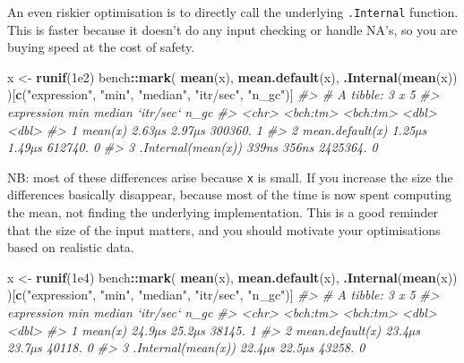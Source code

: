 \documentclass[]{book}
\newenvironment{Shaded}{\begin{snugshade}}{\end{snugshade}}
\newcommand{\CommentTok}[1]{\textcolor[rgb]{0.37,0.37,0.37}{\textit{#1}}}
\newcommand{\FloatTok}[1]{\textcolor[rgb]{0.06,0.06,0.06}{#1}}
\newcommand{\KeywordTok}[1]{\textcolor[rgb]{0.27,0.27,0.27}{\textbf{#1}}}
\newcommand{\NormalTok}[1]{#1}
\newcommand{\OperatorTok}[1]{\textcolor[rgb]{0.43,0.43,0.43}{\textbf{#1}}}
\newcommand{\StringTok}[1]{\textcolor[rgb]{0.5,0.5,0.5}{#1}}
\begin{document}
An even riskier optimisation is to directly call the underlying \texttt{.Internal} function. This is faster because it doesn't do any input checking or handle NA's, so you are buying speed at the cost of safety.

\begin{Shaded}
\begin{Highlighting}[]
\NormalTok{x <-}\StringTok{ }\KeywordTok{runif}\NormalTok{(}\FloatTok{1e2}\NormalTok{)}
\NormalTok{bench}\OperatorTok{::}\KeywordTok{mark}\NormalTok{(}
  \KeywordTok{mean}\NormalTok{(x),}
  \KeywordTok{mean.default}\NormalTok{(x),}
  \KeywordTok{.Internal}\NormalTok{(}\KeywordTok{mean}\NormalTok{(x))}
\NormalTok{)[}\KeywordTok{c}\NormalTok{(}\StringTok{"expression"}\NormalTok{, }\StringTok{"min"}\NormalTok{, }\StringTok{"median"}\NormalTok{, }\StringTok{"itr/sec"}\NormalTok{, }\StringTok{"n_gc"}\NormalTok{)]}
\CommentTok{#> # A tibble: 3 x 5}
\CommentTok{#>   expression              min   median `itr/sec`  n_gc}
\CommentTok{#>   <chr>              <bch:tm> <bch:tm>     <dbl> <dbl>}
\CommentTok{#> 1 mean(x)              2.63µs   2.97µs   300360.     1}
\CommentTok{#> 2 mean.default(x)      1.25µs   1.49µs   612740.     0}
\CommentTok{#> 3 .Internal(mean(x))    339ns    356ns  2425364.     0}
\end{Highlighting}
\end{Shaded}

NB: most of these differences arise because \texttt{x} is small. If you increase the size the differences basically disappear, because most of the time is now spent computing the mean, not finding the underlying implementation. This is a good reminder that the size of the input matters, and you should motivate your optimisations based on realistic data.

\begin{Shaded}
\begin{Highlighting}[]
\NormalTok{x <-}\StringTok{ }\KeywordTok{runif}\NormalTok{(}\FloatTok{1e4}\NormalTok{)}
\NormalTok{bench}\OperatorTok{::}\KeywordTok{mark}\NormalTok{(}
  \KeywordTok{mean}\NormalTok{(x),}
  \KeywordTok{mean.default}\NormalTok{(x),}
  \KeywordTok{.Internal}\NormalTok{(}\KeywordTok{mean}\NormalTok{(x))}
\NormalTok{)[}\KeywordTok{c}\NormalTok{(}\StringTok{"expression"}\NormalTok{, }\StringTok{"min"}\NormalTok{, }\StringTok{"median"}\NormalTok{, }\StringTok{"itr/sec"}\NormalTok{, }\StringTok{"n_gc"}\NormalTok{)]}
\CommentTok{#> # A tibble: 3 x 5}
\CommentTok{#>   expression              min   median `itr/sec`  n_gc}
\CommentTok{#>   <chr>              <bch:tm> <bch:tm>     <dbl> <dbl>}
\CommentTok{#> 1 mean(x)              24.9µs   25.2µs    38145.     1}
\CommentTok{#> 2 mean.default(x)      23.4µs   23.7µs    40118.     0}
\CommentTok{#> 3 .Internal(mean(x))   22.4µs   22.5µs    43258.     0}
\end{Highlighting}
\end{Shaded}
\end{document}
